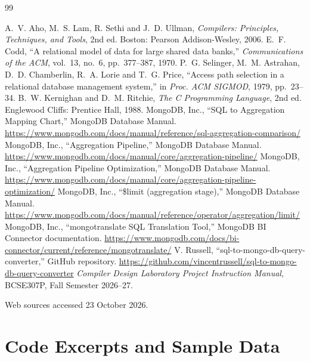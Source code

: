 \documentclass[12pt,a4paper]{report}
\begin{document}
\renewcommand{\bibname}{References}
\begin{thebibliography}{99}
 A.~V. Aho, M.~S. Lam, R. Sethi and J.~D. Ullman, \textit{Compilers: Principles, Techniques, and Tools}, 2nd ed. Boston: Pearson Addison-Wesley, 2006.
 E.~F. Codd, ``A relational model of data for large shared data banks,'' \textit{Communications of the ACM}, vol.~13, no.~6, pp.~377--387, 1970.
 P.~G. Selinger, M.~M. Astrahan, D.~D. Chamberlin, R.~A. Lorie and T.~G. Price, ``Access path selection in a relational database management system,'' in \textit{Proc. ACM SIGMOD}, 1979, pp.~23--34.
 B.~W. Kernighan and D.~M. Ritchie, \textit{The C Programming Language}, 2nd ed. Englewood Cliffs: Prentice Hall, 1988.
 MongoDB, Inc., ``SQL to Aggregation Mapping Chart,'' MongoDB Database Manual. \url{https://www.mongodb.com/docs/manual/reference/sql-aggregation-comparison/}
 MongoDB, Inc., ``Aggregation Pipeline,'' MongoDB Database Manual. \url{https://www.mongodb.com/docs/manual/core/aggregation-pipeline/}
 MongoDB, Inc., ``Aggregation Pipeline Optimization,'' MongoDB Database Manual. \url{https://www.mongodb.com/docs/manual/core/aggregation-pipeline-optimization/}
 MongoDB, Inc., ``\$limit (aggregation stage),'' MongoDB Database Manual. \url{https://www.mongodb.com/docs/manual/reference/operator/aggregation/limit/}
 MongoDB, Inc., ``mongotranslate SQL Translation Tool,'' MongoDB BI Connector documentation. \url{https://www.mongodb.com/docs/bi-connector/current/reference/mongotranslate/}
 V. Russell, ``sql-to-mongo-db-query-converter,'' GitHub repository. \url{https://github.com/vincentrussell/sql-to-mongo-db-query-converter}
 \textit{Compiler Design Laboratory Project Instruction Manual}, BCSE307P, Fall Semester 2026--27.
\end{thebibliography}
\noindent Web sources accessed 23 October 2026.

\appendix
\chapter{Code Excerpts and Sample Data}
\end{document}
